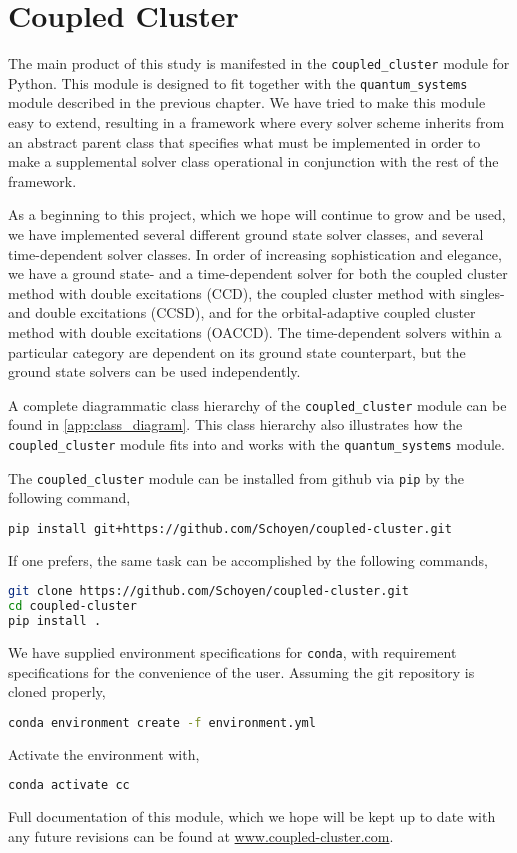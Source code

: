 \chapter{Coupled Cluster}
\label{ch:impl_coupled_cluster}

The main product of this study is manifested in the \lstinline{coupled_cluster}
module for Python. This module is designed to fit together with the
\lstinline{quantum_systems} module described in the previous chapter. We have tried to 
make this module easy to extend, resulting in a framework where every solver scheme 
inherits from an abstract parent class that specifies what must be implemented in order 
to make a supplemental solver class operational in conjunction with the rest of the 
framework.

As a beginning to this project, which we hope will continue to grow and be used, 
we have implemented several different ground state solver classes, and several
time-dependent solver classes. In order of increasing sophistication and 
elegance, we have a ground state- and a time-dependent solver for both the coupled cluster
method
with double excitations (CCD), the coupled cluster method with singles- and double 
excitations (CCSD), and for the orbital-adaptive coupled cluster method with double
excitations (OACCD). The time-dependent solvers within a particular category are 
dependent on its ground state counterpart, but the ground state solvers can be used
independently.

A complete diagrammatic class hierarchy of the \lstinline{coupled_cluster} module 
can be found in \autoref{app:class_diagram}. This class hierarchy also illustrates how 
the \lstinline{coupled_cluster} module fits into and works with the 
\lstinline{quantum_systems} module.

The \lstinline{coupled_cluster} module can be installed from github via \lstinline{pip}
by the following command,
\begin{lstlisting}[language=bash]
pip install git+https://github.com/Schoyen/coupled-cluster.git
\end{lstlisting}
If one prefers, the same task can be accomplished by the following commands,
\begin{lstlisting}[language=bash]
git clone https://github.com/Schoyen/coupled-cluster.git
cd coupled-cluster
pip install .
\end{lstlisting}
We have supplied environment specifications for \lstinline{conda}, with requirement 
specifications for the convenience of the user. Assuming the git repository is cloned 
properly,
\begin{lstlisting}[language=bash]
conda environment create -f environment.yml
\end{lstlisting}
Activate the environment with,
\begin{lstlisting}[language=bash]
conda activate cc
\end{lstlisting}
Full documentation of this module, which we hope will be kept up to date with any future revisions 
can be found at \url{www.coupled-cluster.com}.

